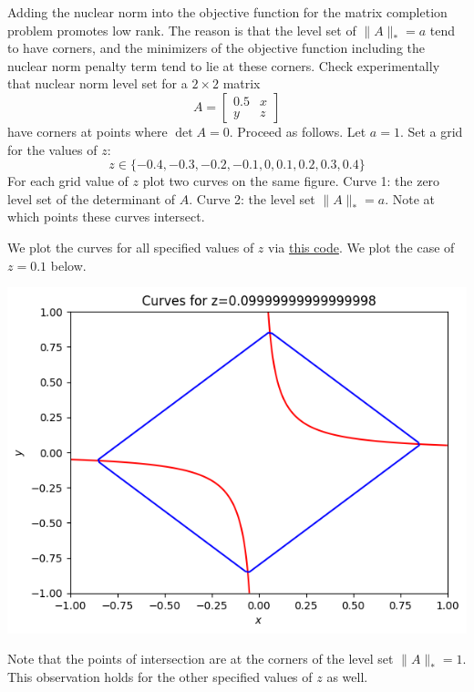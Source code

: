 \documentclass{../../../kin_math}
\begin{document}
\begin{questions}
  \question Adding the nuclear norm into the objective function for the matrix completion problem promotes low  rank. The reason is that the level set of $\lVert A \rVert_* = a$ tend to have corners, and the minimizers of the objective function including the nuclear norm penalty term tend to lie at these corners. Check experimentally that nuclear norm level set for a $2 \times 2$ matrix
  \begin{equation*}
    A = \begin{bmatrix} 0.5 & x \\ y & z \end{bmatrix}
  \end{equation*}
  have corners at points where $\det A = 0$. Proceed as follows. Let $a = 1$. Set a grid for the values of $z$:
  \begin{equation*}
    z \in \{-0.4, -0.3, -0.2, -0.1, 0, 0.1, 0.2, 0.3, 0.4\}
  \end{equation*}
  For each grid value of $z$ plot two curves on the same figure. Curve 1: the zero level set of the determinant of $A$. Curve 2: the level set $\lVert A \rVert_* = a$. Note at which points these curves intersect.
  \begin{solution}
    We plot the curves for all specified values of $z$ via \href{https://github.com/elijahkin/school/blob/main/umd/amsc660/hw7/hw7.ipynb}{this code}. We plot the case of $z = 0.1$ below.
    \begin{center}
      \includegraphics[scale=0.7]{curves.png}
    \end{center}
    Note that the points of intersection are at the corners of the level set $\lVert A \rVert_* = 1$. This observation holds for the other specified values of $z$ as well.
  \end{solution}


\end{questions}
\end{document}
